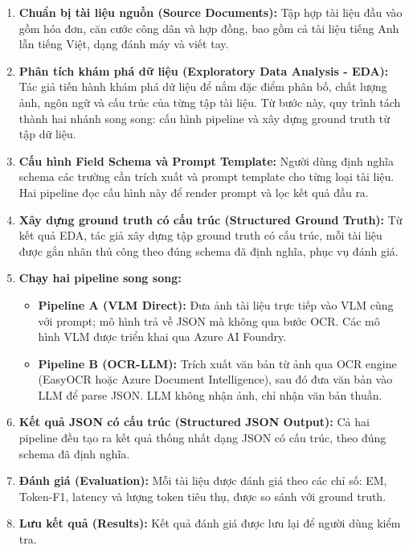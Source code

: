 ﻿\documentclass[12pt]{report}
\begin{document}
\begin{enumerate}
    \item \textbf{Chuẩn bị tài liệu nguồn (Source Documents):} Tập hợp tài liệu đầu vào gồm hóa đơn, căn cước công dân và hợp đồng, bao gồm cả tài liệu tiếng Anh lẫn tiếng Việt, dạng đánh máy và viết tay.

    \item \textbf{Phân tích khám phá dữ liệu (Exploratory Data Analysis - EDA):} Tác giả tiến hành khám phá dữ liệu để nắm đặc điểm phân bố, chất lượng ảnh, ngôn ngữ và cấu trúc của từng tập tài liệu. Từ bước này, quy trình tách thành hai nhánh song song: cấu hình pipeline và xây dựng ground truth từ tập dữ liệu.

    \item \textbf{Cấu hình Field Schema và Prompt Template:} Người dùng định nghĩa schema các trường cần trích xuất và prompt template cho từng loại tài liệu. Hai pipeline đọc cấu hình này để render prompt và lọc kết quả đầu ra.

    \item \textbf{Xây dựng ground truth có cấu trúc (Structured Ground Truth):} Từ kết quả EDA, tác giả xây dựng tập ground truth có cấu trúc, mỗi tài liệu được gắn nhãn thủ công theo đúng schema đã định nghĩa, phục vụ đánh giá.

    \item \textbf{Chạy hai pipeline song song:}
    \begin{itemize}
        \item \textbf{Pipeline A (VLM Direct):} Đưa ảnh tài liệu trực tiếp vào VLM cùng với prompt; mô hình trả về JSON mà không qua bước OCR. Các mô hình VLM được triển khai qua Azure AI Foundry.
        \item \textbf{Pipeline B (OCR-LLM):} Trích xuất văn bản từ ảnh qua OCR engine (EasyOCR hoặc Azure Document Intelligence), sau đó đưa văn bản vào LLM để parse JSON. LLM không nhận ảnh, chỉ nhận văn bản thuần.
    \end{itemize}

    \item \textbf{Kết quả JSON có cấu trúc (Structured JSON Output):} Cả hai pipeline đều tạo ra kết quả thống nhất dạng JSON có cấu trúc, theo đúng schema đã định nghĩa.

    \item \textbf{Đánh giá (Evaluation):} Mỗi tài liệu được đánh giá theo các chỉ số: EM, Token-F1, latency và lượng token tiêu thụ, được so sánh với ground truth.

    \item \textbf{Lưu kết quả (Results):} Kết quả đánh giá được lưu lại để người dùng kiểm tra.


\end{enumerate}
\end{document}

